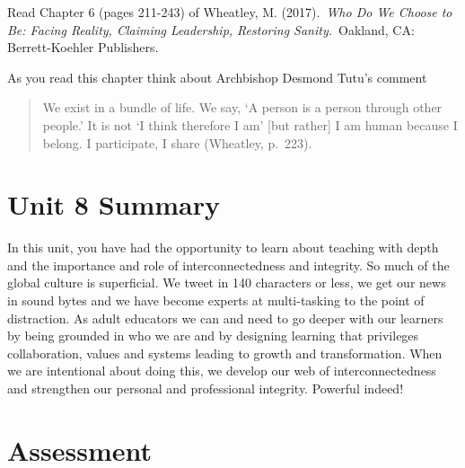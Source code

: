 \documentclass[
]{book}
\begin{document}
\begin{reflect}
Read Chapter 6 (pages 211-243) of Wheatley, M. (2017).~\emph{Who Do We Choose to Be: Facing Reality, Claiming Leadership, Restoring Sanity.}~Oakland, CA: Berrett-Koehler Publishers.

As you read this chapter think about Archbishop Desmond Tutu's comment

\begin{quote}
We exist in a bundle of life. We say, `A person is a person through other people.' It is not `I think therefore I am' {[}but rather{]} I am human because I belong. I participate, I share (Wheatley, p.~223).
\end{quote}
\end{reflect}

\hypertarget{unit-8-summary}{%
\section*{Unit 8 Summary}\label{unit-8-summary}}

In this unit, you have had the opportunity to learn about teaching with depth and the importance and role of interconnectedness and integrity. So much of the global culture is superficial. We tweet in 140 characters or less, we get our news in sound bytes and we have become experts at multi-tasking to the point of distraction. As adult educators we can and need to go deeper with our learners by being grounded in who we are and by designing learning that privileges collaboration, values and systems leading to growth and transformation. When we are intentional about doing this, we develop our web of interconnectedness and strengthen our personal and professional integrity. Powerful indeed!

\hypertarget{assessment-7}{%
\section*{Assessment}\label{assessment-7}}
\end{document}
